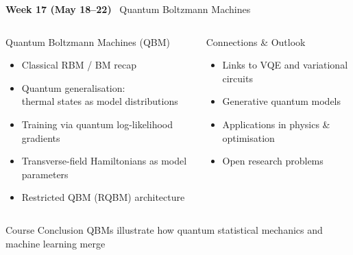 \documentclass[aspectratio=169,12pt]{beamer}
\newcommand{\week}[1]{\textcolor{qgold}{\textbf{#1}}}
\begin{document}
\begin{frame}{\week{Week 17 (May 18--22)} \ Quantum Boltzmann Machines}
  \begin{columns}[T]
      \begin{block}{Quantum Boltzmann Machines (QBM)}
        \begin{itemize}
          \item Classical RBM / BM recap
          \item Quantum generalisation:\\
                thermal states as model distributions
          \item Training via quantum log-likelihood gradients
          \item Transverse-field Hamiltonians as model parameters
          \item Restricted QBM (RQBM) architecture
        \end{itemize}
      \end{block}
      \begin{block}{Connections \& Outlook}
        \begin{itemize}
          \item Links to VQE and variational circuits
          \item Generative quantum models
          \item Applications in physics \& optimisation
          \item Open research problems
        \end{itemize}
      \end{block}
  \end{columns}
  \vspace{4pt}
  \begin{alertblock}{Course Conclusion}
    QBMs illustrate how quantum statistical mechanics and
    machine learning merge
  \end{alertblock}
\end{frame}
\end{document}
